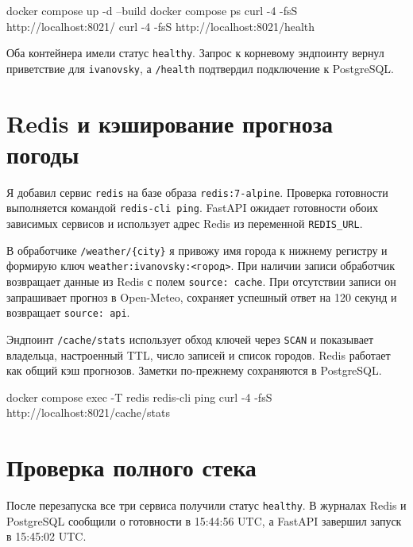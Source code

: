 \begin{code}
docker compose up -d --build
docker compose ps
curl -4 -fsS http://localhost:8021/
curl -4 -fsS http://localhost:8021/health
\end{code}

Оба контейнера имели статус \texttt{healthy}. Запрос к корневому эндпоинту вернул приветствие для \texttt{ivanovsky}, а \texttt{/health} подтвердил подключение к PostgreSQL.


\chapter{Redis и кэширование прогноза погоды}
Я добавил сервис \texttt{redis} на базе образа \texttt{redis:7-alpine}. Проверка готовности выполняется командой \texttt{redis-cli ping}. FastAPI ожидает готовности обоих зависимых сервисов и использует адрес Redis из переменной \texttt{REDIS\_URL}.

В обработчике \texttt{/weather/\{city\}} я привожу имя города к нижнему регистру и формирую ключ \texttt{weather:ivanovsky:\textless{}город\textgreater{}}. При наличии записи обработчик возвращает данные из Redis с полем \texttt{source: cache}. При отсутствии записи он запрашивает прогноз в Open-Meteo, сохраняет успешный ответ на 120 секунд и возвращает \texttt{source: api}.

Эндпоинт \texttt{/cache/stats} использует обход ключей через \texttt{SCAN} и показывает владельца, настроенный TTL, число записей и список городов. Redis работает как общий кэш прогнозов. Заметки по-прежнему сохраняются в PostgreSQL.

\begin{code}
docker compose exec -T redis redis-cli ping
curl -4 -fsS http://localhost:8021/cache/stats
\end{code}

\chapter{Проверка полного стека}
После перезапуска все три сервиса получили статус \texttt{healthy}. В журналах Redis и PostgreSQL сообщили о готовности в 15:44:56 UTC, а FastAPI завершил запуск в 15:45:02 UTC.


